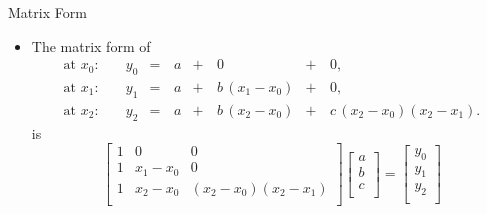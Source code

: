 \documentclass[10pt]{beamer}
\begin{document}
\begin{frame}{Matrix Form}
\begin{itemize}
    \item The matrix form of 
    $$
    \begin{alignedat}{4}
    \text{at }x_0:\quad 
    &y_0  &={}&\,a
    &{}+&\,0
    &{}+&\,0,\\
    \text{at }x_1:\quad 
    &y_1  &={}&\,a
    &{}+&\,b\,(x_1 - x_0)
    &{}+&\,0,\\
    \text{at }x_2:\quad 
    &y_2  &={}&\,a
    &{}+&\,b\,(x_2 - x_0)
    &{}+&\,c\,(x_2 - x_0)(x_2 - x_1).
    \end{alignedat}
    $$
    is
\begin{equation*}
  \begin{bmatrix}
    1 & 0 & 0\\
    1 & x_1 - x_0 & 0\\
    1 & x_2 - x_0 & (x_2-x_0)(x_2-x_1)\\
  \end{bmatrix}
  \begin{bmatrix}
    a\\ b\\ c\\
  \end{bmatrix} =
  \begin{bmatrix}
    y_0\\ y_1\\ y_2\\
  \end{bmatrix}
\end{equation*}

\end{itemize}

\end{frame}
\end{document}
